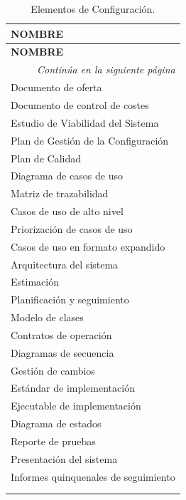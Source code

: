 \begin{center}
\begin{longtable}{l}

\textbf{NOMBRE} \\\hline \hline
\endfirsthead
\textbf{NOMBRE} \\\hline \hline
\endhead

\hline \multicolumn{1}{r}{\textit{Continúa en la siguiente página}} \\
\endfoot
\endlastfoot

Documento de oferta\\
Documento de control de costes\\
Estudio de Viabilidad del Sistema\\
Plan de Gestión de la Configuración\\
Plan de Calidad\\
Diagrama de casos de uso\\
Matriz de trazabilidad\\
Casos de uso de alto nivel\\
Priorización de casos de uso\\
Casos de uso en formato expandido\\
Arquitectura del sistema\\
Estimación\\
Planificación y seguimiento\\
Modelo de clases\\
Contratos de operación\\
Diagramas de secuencia\\
Gestión de cambios\\
Estándar de implementación\\
Ejecutable de implementación\\
Diagrama de estados\\
Reporte de pruebas\\
Presentación del sistema\\
Informes quinquenales de seguimiento\\\hline

\caption{Elementos de Configuración.}\\
\label{tab:EC}
\end{longtable}
\end{center}


